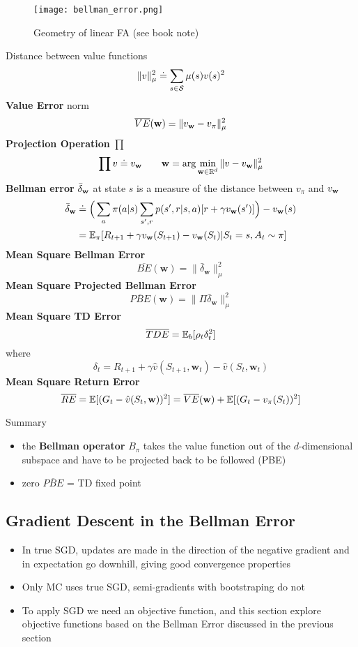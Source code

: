 \documentclass[sutton_barto_notes.tex]{subfiles}
\begin{document}
\begin{figure}[h!]
    \centering
    \texttt{[image: bellman\_error.png]}
    \caption{ Geometry of linear FA (see book note) }
\end{figure}

\newpage
Distance between value functions
$$ \| v \|^2_\mu \doteq \sum_{s \in \operatorname*{\mathcal{S}}} \mu(s) v(s)^2 $$
\textbf{Value Error} norm
$$ \overline{VE}(\operatorname*{\mathbf{w}}) = \| v_{\operatorname*{\mathbf{w}}} - v_\pi \|^2_\mu$$
\textbf{Projection Operation} $\prod$
$$ \prod v \doteq v_{\operatorname*{\mathbf{w}}} \quad\quad {\operatorname*{\mathbf{w}}} = \arg\min_{ {\operatorname*{\mathbf{w}}} \in \operatorname*{\mathbb{R}}^d } \| v - v_{\operatorname*{\mathbf{w}}} \|^2_\mu $$
\textbf{Bellman error} $\bar{\delta}_{\operatorname*{\mathbf{w}}}$ at state $s$ is a measure of the distance between $v_\pi$ and $v_{\operatorname*{\mathbf{w}}}$
\begin{align*}
\bar{\delta}_{\mathbf{w}} & \doteq \Big( \sum_a \pi(a|s) \sum_{s', r} p(s', r| s, a) [r + \gamma v_{\mathbf{w}}(s')]\Big) - v_{\operatorname*{\mathbf{w}}}(s) \\
 & = \mathbb{E}_{\pi} [R_{t+1} + \gamma v_{\mathbf{w}}(S_{t+1}) - v_{\mathbf{w}}(S_{t}) | S_t = s, A_t \sim \pi ]
\end{align*}
\textbf{Mean Square Bellman Error}
$$ \overline{BE}(\mathbf{w}) = \| \bar{\delta}_{\mathbf{w}} \|_{\mu}^2 $$
\textbf{Mean Square Projected Bellman Error}
$$ \overline{PBE}(\mathbf{w}) = \| \Pi\bar{\delta}_{\mathbf{w}} \|_{\mu}^2 $$
\textbf{Mean Square TD Error}
$$ \overline{TDE} = {\operatorname*{\mathbb{E}}}_b [ \rho_t \delta_t^2 ] $$
where
$$ \delta_t = R_{t+1} + \gamma \hat{v}(S_{t+1}, \mathbf{w}_t) - \hat{v}(S_t, \mathbf{w}_t) $$
\textbf{Mean Square Return Error}
$$ \overline{RE} = \operatorname*{\mathbb{E}} [ (G_t - \hat{v}(S_t, \operatorname*{\mathbf{w}}) )^2 ] = \overline{VE} (\operatorname*{\mathbf{w}}) + \operatorname*{\mathbb{E}} [ ( G_t - v_\pi(S_t) )^2 ] $$


Summary
\begin{itemize}
\item the \textbf{Bellman operator} $B_\pi$ takes the value function out of the $d$-dimensional subspace and have to be projected back to be followed (PBE)
\item zero $\overline{PBE}$ = TD fixed point
\end{itemize}

\subsection{Gradient Descent in the Bellman Error}

\begin{itemize}
\item In true SGD, updates are made in the direction of the negative gradient and in expectation go downhill, giving good convergence properties
\item Only MC uses true SGD, semi-gradients with bootstraping do not
\item To apply SGD we need an objective function, and this section explore objective functions based on the Bellman Error discussed in the previous section
\end{itemize}
\end{document}
